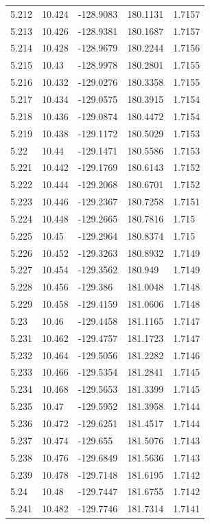 \begin{tabular}{lllll}
5.212 & 10.424 & -128.9083 & 180.1131 & 1.7157 \\
5.213 & 10.426 & -128.9381 & 180.1687 & 1.7157 \\
5.214 & 10.428 & -128.9679 & 180.2244 & 1.7156 \\
5.215 & 10.43 & -128.9978 & 180.2801 & 1.7155 \\
5.216 & 10.432 & -129.0276 & 180.3358 & 1.7155 \\
5.217 & 10.434 & -129.0575 & 180.3915 & 1.7154 \\
5.218 & 10.436 & -129.0874 & 180.4472 & 1.7154 \\
5.219 & 10.438 & -129.1172 & 180.5029 & 1.7153 \\
5.22 & 10.44 & -129.1471 & 180.5586 & 1.7153 \\
5.221 & 10.442 & -129.1769 & 180.6143 & 1.7152 \\
5.222 & 10.444 & -129.2068 & 180.6701 & 1.7152 \\
5.223 & 10.446 & -129.2367 & 180.7258 & 1.7151 \\
5.224 & 10.448 & -129.2665 & 180.7816 & 1.715 \\
5.225 & 10.45 & -129.2964 & 180.8374 & 1.715 \\
5.226 & 10.452 & -129.3263 & 180.8932 & 1.7149 \\
5.227 & 10.454 & -129.3562 & 180.949 & 1.7149 \\
5.228 & 10.456 & -129.386 & 181.0048 & 1.7148 \\
5.229 & 10.458 & -129.4159 & 181.0606 & 1.7148 \\
5.23 & 10.46 & -129.4458 & 181.1165 & 1.7147 \\
5.231 & 10.462 & -129.4757 & 181.1723 & 1.7147 \\
5.232 & 10.464 & -129.5056 & 181.2282 & 1.7146 \\
5.233 & 10.466 & -129.5354 & 181.2841 & 1.7145 \\
5.234 & 10.468 & -129.5653 & 181.3399 & 1.7145 \\
5.235 & 10.47 & -129.5952 & 181.3958 & 1.7144 \\
5.236 & 10.472 & -129.6251 & 181.4517 & 1.7144 \\
5.237 & 10.474 & -129.655 & 181.5076 & 1.7143 \\
5.238 & 10.476 & -129.6849 & 181.5636 & 1.7143 \\
5.239 & 10.478 & -129.7148 & 181.6195 & 1.7142 \\
5.24 & 10.48 & -129.7447 & 181.6755 & 1.7142 \\
5.241 & 10.482 & -129.7746 & 181.7314 & 1.7141 \\

\end{tabular}
